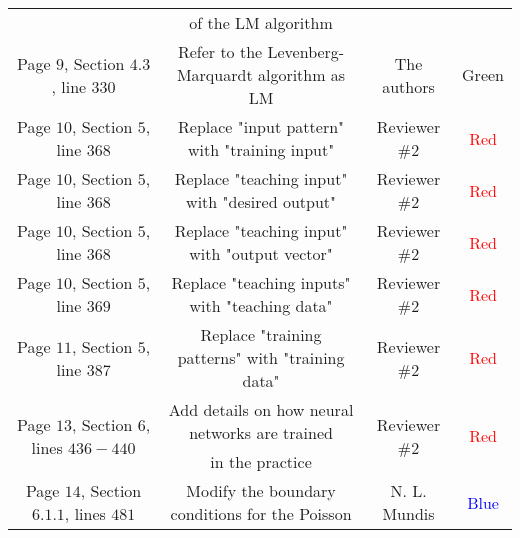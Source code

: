 \documentclass[longtitle]{elsarticle}
\theoremstyle{theorem}
\theoremstyle{definition}
\theoremstyle{remark}
\theoremstyle{proposition}
\numberwithin{figure}{section}
\begin{document}
\begin{longtable}{c|c|c|c}
		\multicolumn{1}{|c|}{} &
		\multicolumn{1}{c|}{of the LM algorithm} &
		\multicolumn{1}{c|}{} &
		\multicolumn{1}{c|}{} \\[0.1cm]
		\cline{1-4}
		\multicolumn{1}{|c|}{Page $9$, Section $4.3$, line $330$} & 
		\multicolumn{1}{c|}{Refer to the Levenberg-Marquardt algorithm as LM} &
		\multicolumn{1}{c|}{The authors} &
		\multicolumn{1}{c|}{\textcolor{deepgreen}{Green}} \\
		\cline{1-4}
		\multicolumn{1}{|c|}{Page $10$, Section $5$, line $368$} & 
		\multicolumn{1}{c|}{Replace "input pattern" with "training input"} &
		\multicolumn{1}{c|}{Reviewer \#2} &
		\multicolumn{1}{c|}{\textcolor{red}{Red}} \\
		\cline{1-4}
		\multicolumn{1}{|c|}{Page $10$, Section $5$, line $368$} & 
		\multicolumn{1}{c|}{Replace "teaching input" with "desired output"} &
		\multicolumn{1}{c|}{Reviewer \#2} &
		\multicolumn{1}{c|}{\textcolor{red}{Red}} \\
		\cline{1-4}
		\multicolumn{1}{|c|}{Page $10$, Section $5$, line $368$} & 
		\multicolumn{1}{c|}{Replace "teaching input" with "output vector"} &
		\multicolumn{1}{c|}{Reviewer \#2} &
		\multicolumn{1}{c|}{\textcolor{red}{Red}} \\
		\cline{1-4}
		\multicolumn{1}{|c|}{Page $10$, Section $5$, line $369$} & 
		\multicolumn{1}{c|}{Replace "teaching inputs" with "teaching data"} &
		\multicolumn{1}{c|}{Reviewer \#2} &
		\multicolumn{1}{c|}{\textcolor{red}{Red}} \\
		\cline{1-4}
		\multicolumn{1}{|c|}{Page $11$, Section $5$, line $387$} & 
		\multicolumn{1}{c|}{Replace "training patterns" with "training data"} &
		\multicolumn{1}{c|}{Reviewer \#2} &
		\multicolumn{1}{c|}{\textcolor{red}{Red}} \\
		\cline{1-4}
		\multicolumn{1}{|c|}{\multirow{2}{*}{Page $13$, Section $6$, lines $436-440$}} & 
		\multicolumn{1}{c|}{Add details on how neural networks are trained} &
		\multicolumn{1}{c|}{\multirow{2}{*}{Reviewer \#2}} &
		\multicolumn{1}{c|}{\multirow{2}{*}{\textcolor{red}{Red}}} \\[-0.1cm]
		\multicolumn{1}{|c|}{} &
		\multicolumn{1}{c|}{in the practice} &
		\multicolumn{1}{c|}{} &
		\multicolumn{1}{c|}{} \\[0.1cm]
		\cline{1-4}
		\multicolumn{1}{|c|}{\multirow{3}{*}{Page $14$, Section $6.1.1$, lines $481$}} & 
		\multicolumn{1}{c|}{Modify the boundary conditions for the Poisson} &
		\multicolumn{1}{c|}{\multirow{3}{*}{N. L. Mundis}} &
		\multicolumn{1}{c|}{\multirow{3}{*}{\textcolor{blue}{Blue}}} \\[-0.1cm]

\end{longtable}
\end{document}
